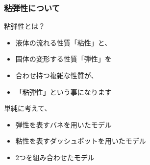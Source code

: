 \documentclass[12pt, dvipdfmx]{beamer}
\begin{document}
\begin{frame}
	\frametitle{粘弾性について}
		\begin{block}{粘弾性とは？}
			\begin{itemize}
				\item 液体の流れる性質「粘性」と、
				\item 固体の変形する性質「弾性」を
				\item 合わせ持つ複雑な性質が、
				\item 「粘弾性」という事になります
			\end{itemize}
		\end{block}
		\begin{exampleblock}{単純に考えて、}
			\begin{itemize}
				\item 弾性を表すバネを用いたモデル
				\item 粘性を表すダッシュポットを用いたモデル
				\item 2つを組み合わせたモデル
			\end{itemize}
		\end{exampleblock}
\end{frame}
\end{document}
